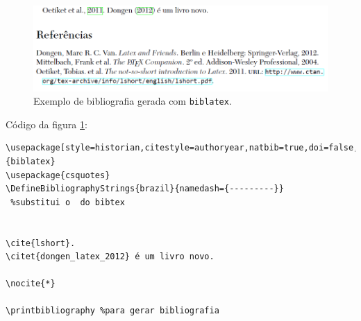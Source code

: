 \begin{figure}
\centering
\includegraphics[width=0.7\linewidth]{./biblatex-figura}
\caption{Exemplo de bibliografia gerada com \texttt{biblatex}.}
\label{fig:biblatex-figura}
\end{figure}

Código da figura \ref{fig:biblatex-figura}:

\begin{verbatim}
\usepackage[style=historian,citestyle=authoryear,natbib=true,doi=false,backend=bibtex]{biblatex}
\usepackage{csquotes}
\DefineBibliographyStrings{brazil}{namedash={---------}}
 %substitui o  do bibtex


\cite{lshort}.
\citet{dongen_latex_2012} é um livro novo.

\nocite{*}

\printbibliography %para gerar bibliografia



\end{verbatim}

